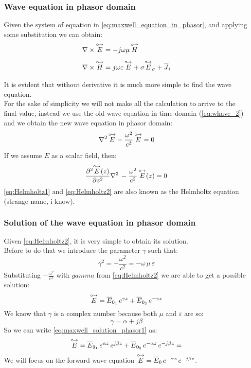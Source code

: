 \subsubsection*{Wave equation in phasor domain}
Given the system of equation in \cref{eq:maxwell_equation_in_phasor}, and applying some substitution we can obtain:
\begin{align}\label{eq:maxwell_equation_in_phasor_2}
    \begin{split}
        &\nabla\times\overset{\mathbin {{\circ \mkern-2.5mu\rightarrow}}}{E}=-j\omega\mu\,\overset{\mathbin {{\circ \mkern-2.5mu\rightarrow}}}{H}\\[5pt]
        &\nabla\times\overset{\mathbin {{\circ \mkern-2.5mu\rightarrow}}}{H}=j\omega \varepsilon\,\overset{\mathbin {{\circ \mkern-2.5mu\rightarrow}}}{E}+\sigma\overset{\mathbin {{\circ \mkern-2.5mu\rightarrow}}}{E}_\sigma+\overline{J}_i\\[5pt]
    \end{split}
\end{align}
It is evident that without derivative it is much more simple to find the wave equation.\\
For the sake of simplicity we will not make all the calculation to arrive to the final value, instead we use the old wave equation in time domain (\cref{eq:whave_2}) and we obtain the new wave equation in phasor domain:
\begin{equation}\label{eq:Helmholtz1}
    \nabla^2\,\overset{\mathbin {{\circ \mkern-2.5mu\rightarrow}}}{E}-\frac{\omega^2}{c^2}\,\overset{\mathbin {{\circ \mkern-2.5mu\rightarrow}}}{E}=0
\end{equation}
If we assume $E$ as a scalar field, then:
\begin{equation}\label{eq:Helmholtz2}
    \frac{\partial^2\overset{\mathbin {{\circ \mkern-2.5mu\rightarrow}}}{E}(z)}{\partial z^2}\nabla^2\,-\frac{\omega^2}{c^2}\,\overset{\mathbin {{\circ \mkern-2.5mu\rightarrow}}}{E}(z)=0
\end{equation}
\cref{eq:Helmholtz1} and \cref{eq:Helmholtz2} are also known as the Helmholtz equation (strange name, i know).
\subsubsection*{Solution of the wave equation in phasor domain}
Given \cref{eq:Helmholtz2}, it is very simple to obtain its solution.\\
Before to do that we introduce the parameter $\gamma$ such that:
\begin{equation}\label{eq:gamma_1}
    \gamma^2=-\frac{\omega^2}{c^2}=-\omega\,\mu\,\varepsilon
\end{equation}
Substituting $-\frac{\omega^2}{c^2}$ with $gamma$ from \cref{eq:Helmholtz2} we are able to get a possible solution:
\begin{equation}\label{eq:maxwell_solution_phasor1}
    \overset{\mathbin {{\circ \mkern-2.5mu\rightarrow}}}{E}=\overline{E}_{0_1}\,e^{\gamma z}+\overline{E}_{0_2}\,e^{-\gamma z}
\end{equation}
We know that $\gamma$ is a complex number because both $\mu$ and $\varepsilon$ are so:
\begin{equation}
    \gamma=\alpha+j\beta
\end{equation}
So we can write \cref{eq:maxwell_solution_phasor1} as:
\begin{equation}\label{eq:maxwell_solution_phasor}
    \overset{\mathbin {{\circ \mkern-2.5mu\rightarrow}}}{E}=\overline{E}_{0_1}\,e^{\alpha z}\,e^{j\beta z}+\overline{E}_{0_2}\,e^{-\alpha z}\,e^{-j\beta z}=
\end{equation}
We will focus on the forward wave equation $\overset{\mathbin {{\circ \mkern-2.5mu\rightarrow}}}{E}=\overline{E}_{0}\,e^{-\alpha z}\,e^{-j\beta z}$.
